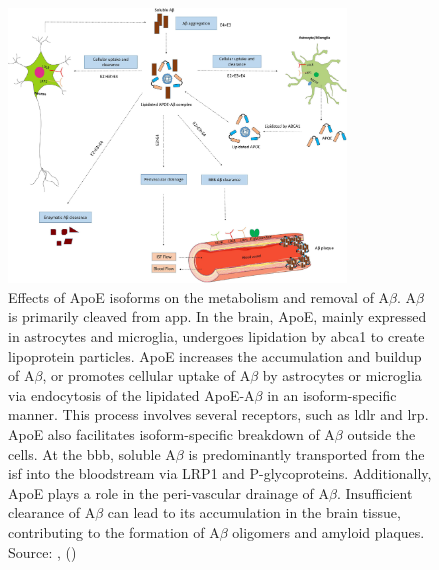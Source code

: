 \documentclass{amsart}
\begin{document}
\begin{figure}[t]
  \includegraphics[width=0.8\textwidth]{figures/ApoEeffectsB.jpg}
    \caption{Effects of ApoE isoforms on the metabolism and removal of A$\beta$. A$\beta$ is primarily cleaved from \acrfull{app}. In the brain, ApoE, mainly expressed in astrocytes and microglia, undergoes lipidation by \acrfull{abca1} to create lipoprotein particles. ApoE increases the accumulation and buildup of A$\beta$, or promotes cellular uptake of A$\beta$ by astrocytes or microglia via endocytosis of the lipidated ApoE-A$\beta$ in an isoform-specific manner. This process involves several receptors, such as \acrfull{ldlr} and \acrfull{lrp}. ApoE also facilitates isoform-specific breakdown of A$\beta$ outside the cells. At the \acrlong{bbb}, soluble A$\beta$ is predominantly transported from the \acrfull{isf} into the bloodstream via LRP1 and P-glycoproteins. Additionally, ApoE plays a role in the peri-vascular drainage of A$\beta$. Insufficient clearance of A$\beta$ can lead to its accumulation in the brain tissue, contributing to the formation of A$\beta$ oligomers and amyloid plaques. Source: ,  (\citeyear{Husain2021APOETherapeutics}) \cite{Husain2021APOETherapeutics}}
  \label{ApoeEffectsA}
\end{figure}
\end{document}
